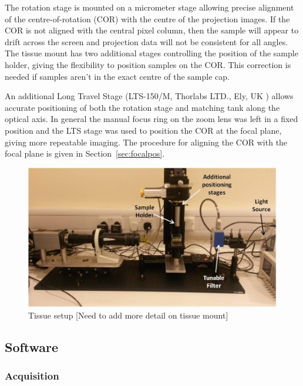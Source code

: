 The rotation stage is mounted on a micrometer stage allowing  precise alignment of the centre-of-rotation (COR) with the centre of the projection images. If the COR is not aligned with the central pixel column, then the sample will appear to drift across the screen and projection data will not be consistent for all angles. \cite{Oldham:2006b}
The tissue mount has two additional stages controlling the position of the sample holder, giving the flexibility to position  samples on the COR. This correction is needed if samples aren't in the exact centre of the sample cap. 
 
An additional Long Travel Stage (LTS-150/M, Thorlabs LTD., Ely, UK ) allows accurate positioning of both the rotation stage and matching tank along the optical axis. In general the manual focus ring on the zoom lens was left in a fixed position and the LTS stage was used to position the COR at the focal plane, giving more repeatable imaging. The procedure for aligning the COR with the focal plane is given  in Section~\ref{sec:focalpos}.

\begin{figure}
\centering
\includegraphics[width=\linewidth]{meth_img/tissue_setup}
\caption{Tissue setup [Need to add more detail on tissue mount]}
\label{fig:tissue_setup}
\end{figure}





\subsection{Software}
\subsubsection{Acquisition}


